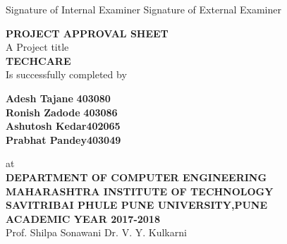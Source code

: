 \documentclass[12pt,a4paper]{report}
\begin{document}
\begin{center}
\begin{center}
	\vspace{0.3 in}
	
	Signature of Internal Examiner \hspace{0.7 in} \hspace{0.7 in} Signature of External Examiner
\end{center}

\begin{center}
	\textbf{PROJECT APPROVAL SHEET}\\
	\vspace{0.2 in}
	A Project title\\
	\vspace{0.1 in}
	\textbf{TECHCARE}\\
	\vspace{0.15 in}
	Is successfully completed by\\
	\begin{flushleft}
		\begin{flushleft}
\hspace{1.7in}\textbf{Adesh Tajane}
\hspace{0.38in}\textbf{  403080}\\
\hspace{1.7in}\textbf{Ronish Zadode}    
 \hspace{0.3in}\textbf{  403086}\\
\hspace{1.7in}\textbf{Ashutosh Kedar}\hspace{0.3in}\textbf{402065}\\
\hspace{1.7in}\textbf{Prabhat Pandey}\hspace{0.3in}\textbf{403049}\\
\end{flushleft}
	\end{flushleft}
	at\\
	\vspace{0.1 in}
\textbf{DEPARTMENT OF COMPUTER ENGINEERING}\\
	\vspace{0.1 in}
	\textbf{MAHARASHTRA INSTITUTE OF TECHNOLOGY}\\
	\vspace{0.1 in}
	\textbf{SAVITRIBAI PHULE PUNE UNIVERSITY,PUNE}\\
	\vspace*{0.1 in}
	\textbf{ACADEMIC YEAR 2017-2018}\\
	\vspace{0.9 in}
	Prof. Shilpa Sonawani \hspace{0.9 in}\hspace{0.9 in} \hspace{0.9 in}Dr. V. Y. Kulkarni\\

\end{center}
\end{center}
\end{document}
